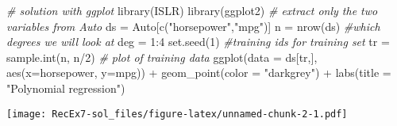 \documentclass[
]{article}
\newenvironment{Shaded}{\begin{snugshade}}{\end{snugshade}}
\newcommand{\AttributeTok}[1]{\textcolor[rgb]{0.77,0.63,0.00}{#1}}
\newcommand{\CommentTok}[1]{\textcolor[rgb]{0.56,0.35,0.01}{\textit{#1}}}
\newcommand{\DecValTok}[1]{\textcolor[rgb]{0.00,0.00,0.81}{#1}}
\newcommand{\FunctionTok}[1]{\textcolor[rgb]{0.00,0.00,0.00}{#1}}
\newcommand{\NormalTok}[1]{#1}
\newcommand{\OtherTok}[1]{\textcolor[rgb]{0.56,0.35,0.01}{#1}}
\newcommand{\SpecialCharTok}[1]{\textcolor[rgb]{0.00,0.00,0.00}{#1}}
\newcommand{\StringTok}[1]{\textcolor[rgb]{0.31,0.60,0.02}{#1}}
\begin{document}
\begin{Shaded}
\begin{Highlighting}[]
\CommentTok{\# solution with ggplot}
\FunctionTok{library}\NormalTok{(ISLR)}
\FunctionTok{library}\NormalTok{(ggplot2)}
\CommentTok{\# extract only the two variables from Auto}
\NormalTok{ds }\OtherTok{=}\NormalTok{ Auto[}\FunctionTok{c}\NormalTok{(}\StringTok{"horsepower"}\NormalTok{,}\StringTok{"mpg"}\NormalTok{)]}
\NormalTok{n }\OtherTok{=} \FunctionTok{nrow}\NormalTok{(ds)}
\CommentTok{\#which degrees we will look at}
\NormalTok{deg }\OtherTok{=} \DecValTok{1}\SpecialCharTok{:}\DecValTok{4}
\FunctionTok{set.seed}\NormalTok{(}\DecValTok{1}\NormalTok{)}
\CommentTok{\#training ids for training set}
\NormalTok{tr }\OtherTok{=} \FunctionTok{sample.int}\NormalTok{(n, n}\SpecialCharTok{/}\DecValTok{2}\NormalTok{)}
\CommentTok{\# plot of training data}
\FunctionTok{ggplot}\NormalTok{(}\AttributeTok{data =}\NormalTok{ ds[tr,], }\FunctionTok{aes}\NormalTok{(}\AttributeTok{x=}\NormalTok{horsepower, }\AttributeTok{y=}\NormalTok{mpg)) }\SpecialCharTok{+} 
  \FunctionTok{geom\_point}\NormalTok{(}\AttributeTok{color =} \StringTok{"darkgrey"}\NormalTok{) }\SpecialCharTok{+} 
  \FunctionTok{labs}\NormalTok{(}\AttributeTok{title =} \StringTok{"Polynomial regression"}\NormalTok{)}
\end{Highlighting}
\end{Shaded}

\texttt{[image: RecEx7-sol\_files/figure-latex/unnamed-chunk-2-1.pdf]}
\end{document}
